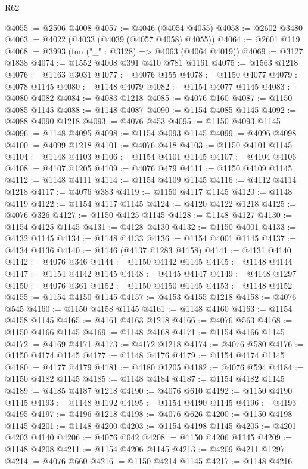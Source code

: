 \begin{lexlean}{R62}
\begin{coremodule}
@4055 := @2506 @4008
@4057 := @4046 (@4054 @4055)
@4058 := @2602 @3480
@4063 := @4022 (@4033 (@4039 (@4057 @4058) @4055))
@4064 := @2601 @119
@4068 := @3993 (fun ("_" : @3128) => @4063 (@4064 @4019))
@4069 := @3127 @1838
@4074 := @1552 @4008 @391 @410 @781 @1161
@4075 := @1563 @1218
@4076 := @1163 @3031
@4077 := @4076 @155
@4078 := @1150 @4077
@4079 := @4078 @1145
@4080 := @1148 @4079
@4082 := @1154 @4077 @1145
@4083 := @4080 @4082
@4084 := @4083 @1218
@4085 := @4076 @160
@4087 := @1150 @4085 @1145
@4088 := @1148 @4087
@4090 := @1154 @4085 @1145
@4092 := @4088 @4090 @1218
@4093 := @4076 @453
@4095 := @1150 @4093 @1145
@4096 := @1148 @4095
@4098 := @1154 @4093 @1145
@4099 := @4096 @4098
@4100 := @4099 @1218
@4101 := @4076 @418
@4103 := @1150 @4101 @1145
@4104 := @1148 @4103
@4106 := @1154 @4101 @1145
@4107 := @4104 @4106
@4108 := @4107 @1205
@4109 := @4076 @479
@4111 := @1150 @4109 @1145
@4112 := @1148 @4111
@4114 := @1154 @4109 @1145
@4116 := @4112 @4114 @1218
@4117 := @4076 @383
@4119 := @1150 @4117 @1145
@4120 := @1148 @4119
@4122 := @1154 @4117 @1145
@4124 := @4120 @4122 @1218
@4125 := @4076 @326
@4127 := @1150 @4125 @1145
@4128 := @1148 @4127
@4130 := @1154 @4125 @1145
@4131 := @4128 @4130
@4132 := @1150 @4001
@4133 := @4132 @1145
@4134 := @1148 @4133
@4136 := @1154 @4001 @1145
@4137 := @4134 @4136
@4140 := @1146 (@4137 @1283 @1158)
@4141 := @4131 @4140
@4142 := @4076 @346
@4144 := @1150 @4142 @1145
@4145 := @1148 @4144
@4147 := @1154 @4142 @1145
@4148 := @4145 @4147
@4149 := @4148 @1297
@4150 := @4076 @361
@4152 := @1150 @4150 @1145
@4153 := @1148 @4152
@4155 := @1154 @4150 @1145
@4157 := @4153 @4155 @1218
@4158 := @4076 @545
@4160 := @1150 @4158 @1145
@4161 := @1148 @4160
@4163 := @1154 @4158 @1145
@4165 := @4161 @4163 @1218
@4166 := @4076 @563
@4168 := @1150 @4166 @1145
@4169 := @1148 @4168
@4171 := @1154 @4166 @1145
@4172 := @4169 @4171
@4173 := @4172 @1218
@4174 := @4076 @580
@4176 := @1150 @4174 @1145
@4177 := @1148 @4176
@4179 := @1154 @4174 @1145
@4180 := @4177 @4179
@4181 := @4180 @1205
@4182 := @4076 @594
@4184 := @1150 @4182 @1145
@4185 := @1148 @4184
@4187 := @1154 @4182 @1145
@4189 := @4185 @4187 @1218
@4190 := @4076 @610
@4192 := @1150 @4190 @1145
@4193 := @1148 @4192
@4195 := @1154 @4190 @1145
@4196 := @4193 @4195
@4197 := @4196 @1218
@4198 := @4076 @626
@4200 := @1150 @4198 @1145
@4201 := @1148 @4200
@4203 := @1154 @4198 @1145
@4205 := @4201 @4203 @4140
@4206 := @4076 @642
@4208 := @1150 @4206 @1145
@4209 := @1148 @4208
@4211 := @1154 @4206 @1145
@4213 := @4209 @4211 @1297
@4214 := @4076 @660
@4216 := @1150 @4214 @1145
@4217 := @1148 @4216

\end{coremodule}
\end{lexlean}
